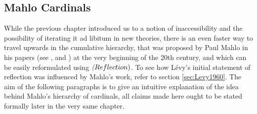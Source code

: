 \documentclass[12pt,a4paper]{article}
\newcommand{\power}[1]{\ensuremath{\mathscr{P}} (#1)}
\newcommand{\then}{\rightarrow}
\begin{document}
{\begin{comment}
 \newline
 Finally, we shall prove that $(ii) \then (i)$. Since it obviously holds that $\kappa > \omega$, we have yet to prove that $\kappa$ is regular and a~strong limit. Let's argue by contradiction that it is regular. 
 If it wasn't, there would be a~$\beta < \kappa$ and a~function $F: \beta \implies \kappa$ with range unbounded in $\kappa$. Set $R = \{\beta\} \cup F$. By hypothesis there is an $\alpha < \kappa$ such that $\langle V_\alpha, \in, R \cap V_\alpha \rangle \prec \langle V_\kappa, \in, R \rangle$. Since $\beta$ is the single ordinal in R, $\beta \in V_\alpha$ by elementarity. This yields the desired contradiction since the domain if $F \cap V_\alpha$ cannot be all of $\beta$.
 \newline\newline
 Next, let's see whether $\kappa$ is indeed a~strong limit, again by contradiction. If not, there would be a~$\lambda < \kappa$ such that $2^\lambda \geq \kappa$. Let $G: \power{\lambda} \implies \kappa$ be surjective and set $R = \{\lambda + 1\} \cup G$. By hypothesis, there is an $\alpha < \kappa$ such that $\langle V_\alpha, \in, R \cap V_\alpha \rangle \prec \langle V_\kappa, \in, R \rangle$. $\lambda + 1 \in V_\alpha$ and so $\power{\lambda} \in V_\alpha$, but this is again a~contradiction.
\end{proof}
\
\end{comment}
}

%
%

\subsection{Mahlo Cardinals}


While the previous chapter introduced us to a notion of inaccessibility and the possibility of iterating it ad libitum in new theories, there is an even faster way to travel upwards in the cumulative hierarchy, that was proposed by Paul Mahlo in his papers (see \cite{Mahlo11}, \cite{Mahlo12} and \cite{Mahlo13}) at the very beginning of the 20th century, and which can be easily reformulated using $\emph(Reflection)$. To see how Lévy's initial statement of reflection was influenced by Mahlo's work, refer to section \ref{sec:Levy1960}. The aim of the following paragraphs is to give an intuitive explanation of the idea behind Mahlo's hierarchy of cardinals, all claims made here ought to be stated formally later in the very same chapter.
\end{document}
